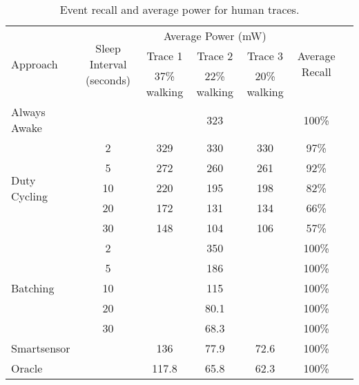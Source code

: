 \begin{table*}[t]
\centering
{\small
    \begin{tabular}{|l|c|c|c|c|c|c|}
    \hline
	\multirow{3}{*}{Approach}		& \multirow{3}{*}{\parbox{1.9cm}{Sleep Interval (seconds)}}
												& \multicolumn{3}{c|}{\parbox{5.2cm}{Average Power (mW)}}
																								& \multirow{3}{*}{\parbox{1.5cm}{Average Recall}} \\ \cline{3-5}
									&			& Trace 1		& Trace 2		& Trace 3 		& 							\\ 
									&			& 37\% walking	& 22\% walking		& 20\% walking		& \\ \hline
	Always Awake					& 			& \multicolumn{3}{c|}{323} 						& 100\% \\ \hline
	\multirow{5}{*}{Duty Cycling}	& 2			& 329			& 330			& 330			& 97\%	\\ \cline{2-6}
									& 5			& 272			& 260			& 261			& 92\%	\\ \cline{2-6}
									& 10		& 220			& 195			& 198			& 82\%	\\ \cline{2-6}
									& 20		& 172			& 131			& 134			& 66\%	\\ \cline{2-6}
									& 30		& 148			& 104			& 106			& 57\%	\\ \hline
	\multirow{5}{*}{Batching}		& 2			& \multicolumn{3}{c|}{350} 						& 100\% \\ \cline{2-6}
									& 5			& \multicolumn{3}{c|}{186} 						& 100\% \\ \cline{2-6}
	 								& 10		& \multicolumn{3}{c|}{115} 						& 100\% \\ \cline{2-6}
	 								& 20		& \multicolumn{3}{c|}{80.1} 					& 100\% \\ \cline{2-6}
	 								& 30		& \multicolumn{3}{c|}{68.3} 					& 100\% \\ \hline
	Smartsensor				&			& 136			& 77.9			& 72.6			& 100\% \\ \hline
	Oracle				&			& 117.8			& 65.8			& 62.3			& 100\% \\ \hline



    \end{tabular}
}
	\caption{Event recall and average power for human traces.}
	\label{table:macrobenchmarks}
\end{table*}


